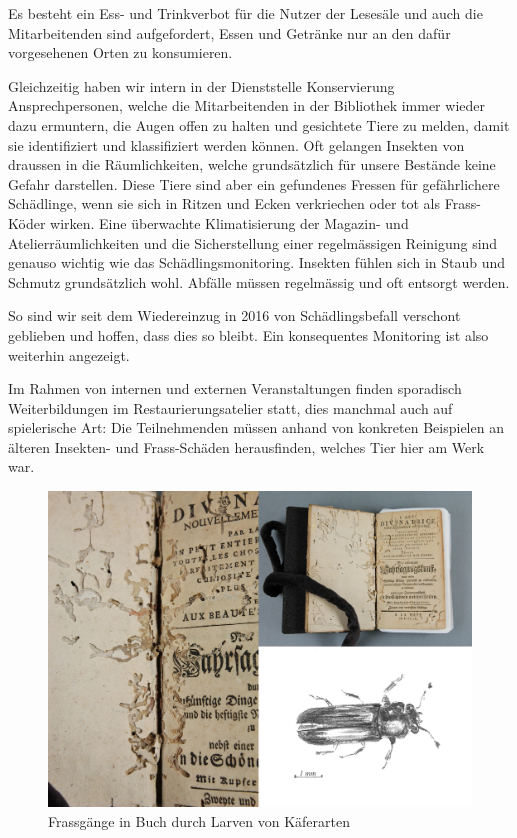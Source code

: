 \documentclass[a4paper,
fontsize=11pt,
oneside,
numbers=noperiodatend,
parskip=half-,
bibliography=totoc,
final
]{scrartcl}
\begin{document}
Es besteht ein Ess- und Trinkverbot für die Nutzer der Lesesäle und auch
die Mitarbeitenden sind aufgefordert, Essen und Getränke nur an den
dafür vorgesehenen Orten zu konsumieren.

Gleichzeitig haben wir intern in der Dienststelle Konservierung
Ansprechpersonen, welche die Mitarbeitenden in der Bibliothek immer
wieder dazu ermuntern, die Augen offen zu halten und gesichtete Tiere zu
melden, damit sie identifiziert und klassifiziert werden können. Oft
gelangen Insekten von draussen in die Räumlichkeiten, welche
grundsätzlich für unsere Bestände keine Gefahr darstellen. Diese Tiere
sind aber ein gefundenes Fressen für gefährlichere Schädlinge, wenn sie
sich in Ritzen und Ecken verkriechen oder tot als Frass-Köder wirken.
Eine überwachte Klimatisierung der Magazin- und Atelierräumlichkeiten
und die Sicherstellung einer regelmässigen Reinigung sind genauso
wichtig wie das Schädlingsmonitoring. Insekten fühlen sich in Staub und
Schmutz grundsätzlich wohl. Abfälle müssen regelmässig und oft entsorgt
werden.

So sind wir seit dem Wiedereinzug in 2016 von Schädlingsbefall verschont
geblieben und hoffen, dass dies so bleibt. Ein konsequentes Monitoring
ist also weiterhin angezeigt.

Im Rahmen von internen und externen Veranstaltungen finden sporadisch
Weiterbildungen im Restaurierungsatelier statt, dies manchmal auch auf
spielerische Art: Die Teilnehmenden müssen anhand von konkreten
Beispielen an älteren Insekten- und Frass-Schäden herausfinden, welches
Tier hier am Werk war.

\begin{figure}
\centering
\includegraphics{img/image3.png}
\caption{Frassgänge in Buch durch Larven von Käferarten}
\end{figure}
\end{document}
